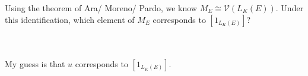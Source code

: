 Using the theorem of Ara/ Moreno/ Pardo, we know $M_E\cong\mathcal{V}(L_K(E))$. Under this
identification, which element of $M_E$ corresponds to $[1_{L_K(E)}]$?\\\\

\begin{solution}\renewcommand{\qedsymbol}{}\ \\
    My guess is that $u$ corresponds to $[1_{L_K(E)}]$.
\end{solution}